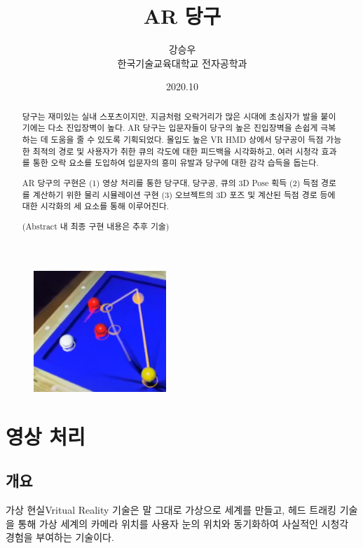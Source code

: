 \documentclass[10pt]{oblivoir}
\title{AR 당구}
\author{강승우 \\ 한국기술교육대학교 전자공학과}
\date{2020.10}
\newcommand{\textss}[1]{\scriptsize#1\normalsize}
\begin{document}
\maketitle

\begin{figure}[ht]
    \centering
    \includegraphics[width=5cm]{img/abstract-final.png}
\end{figure}

\begin{abstract}
    당구는 재미있는 실내 스포츠이지만, 지금처럼 오락거리가 많은 시대에 초심자가 발을 붙이기에는 다소 진입장벽이 높다. AR 당구는 입문자들이 당구의 높은 진입장벽을 손쉽게 극복하는 데 도움을 줄 수 있도록 기획되었다. 몰입도 높은 VR HMD \footnotemark 상에서 당구공이 득점 가능한 최적의 경로 및 사용자가 취한 큐의 각도에 대한 피드백을 시각화하고, 여러 시청각 효과를 통한 오락 요소를 도입하여 입문자의 흥미 유발과 당구에 대한 감각 습득을 돕는다.

    AR 당구의 구현은 (1) 영상 처리를 통한 당구대, 당구공, 큐의 3D Pose 획득 (2) 득점 경로를 계산하기 위한 물리 시뮬레이션 구현 (3) 오브젝트의 3D 포즈 및 계산된 득점 경로 등에 대한 시각화의 세 요소를 통해 이루어진다.

    (Abstract 내 최종 구현 내용은 추후 기술)
\end{abstract}

\newpage

\section{영상 처리}
\subsection{개요}
가상 현실\textss{Vritual Reality} 기술은 말 그대로 가상으로 세계를 만들고, 헤드 트래킹 기술을 통해 가상 세계의 카메라 위치를 사용자 눈의 위치와 동기화하여 사실적인 시청각 경험을 부여하는 기술이다.
\end{document}
